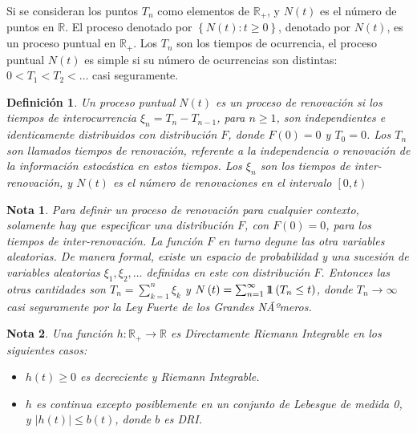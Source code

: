 \documentclass{article}
\newtheorem{Def}{Definición}
\newtheorem{Note}{Nota}
\newcommand{\rea}{\mathbb{R}}
\newcommand{\indora}{\mbox{$1$\hspace{-0.8ex}$1$}}
\begin{document}
Si se consideran los puntos $T_{n}$ como elementos de $\rea_{+}$, y $N\left(t\right)$ es el n\'umero de puntos en $\rea$. El proceso denotado por $\left\{N\left(t\right):t\geq0\right\}$, denotado por $N\left(t\right)$, es un proceso puntual en $\rea_{+}$. Los $T_{n}$ son los tiempos de ocurrencia, el proceso puntual $N\left(t\right)$ es simple si su n\'umero de ocurrencias son distintas: $0<T_{1}<T_{2}<\ldots$ casi seguramente.

\begin{Def}
Un proceso puntual $N\left(t\right)$ es un proceso de renovaci\'on si los tiempos de interocurrencia $\xi_{n}=T_{n}-T_{n-1}$, para $n\geq1$, son independientes e identicamente distribuidos con distribuci\'on $F$, donde $F\left(0\right)=0$ y $T_{0}=0$. Los $T_{n}$ son llamados tiempos de renovaci\'on, referente a la independencia o renovaci\'on de la informaci\'on estoc\'astica en estos tiempos. Los $\xi_{n}$ son los tiempos de inter-renovaci\'on, y $N\left(t\right)$ es el n\'umero de renovaciones en el intervalo $\left[0,t\right)$
\end{Def}


\begin{Note}
Para definir un proceso de renovaci\'on para cualquier contexto, solamente hay que especificar una distribuci\'on $F$, con $F\left(0\right)=0$, para los tiempos de inter-renovaci\'on. La funci\'on $F$ en turno degune las otra variables aleatorias. De manera formal, existe un espacio de probabilidad y una sucesi\'on de variables aleatorias $\xi_{1},\xi_{2},\ldots$ definidas en este con distribuci\'on $F$. Entonces las otras cantidades son $T_{n}=\sum_{k=1}^{n}\xi_{k}$ y $N\left(t\right)=\sum_{n=1}^{\infty}\indora\left(T_{n}\leq t\right)$, donde $T_{n}\rightarrow\infty$ casi seguramente por la Ley Fuerte de los Grandes NÃºmeros.
\end{Note}

%
%

\begin{Note} Una funci\'on $h:\rea_{+}\rightarrow\rea$ es Directamente Riemann Integrable en los siguientes casos:
\begin{itemize}
\item[a)] $h\left(t\right)\geq0$ es decreciente y Riemann Integrable.
\item[b)] $h$ es continua excepto posiblemente en un conjunto de Lebesgue de medida 0, y $|h\left(t\right)|\leq b\left(t\right)$, donde $b$ es DRI.
\end{itemize}
\end{Note}
\end{document}
